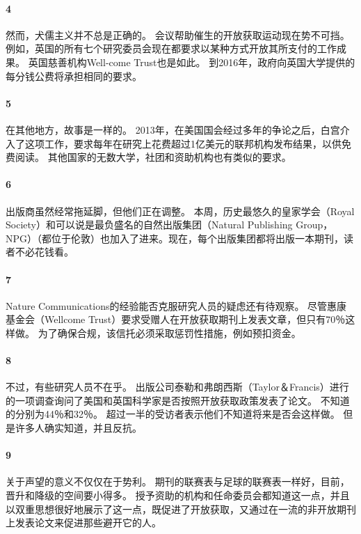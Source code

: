 \documentclass[a4paper, 12pt, UTF8]{article}
\begin{document}
\paragraph{4}然而，犬儒主义并不总是正确的。 会议帮助催生的开放获取运动现在势不可挡。 例如，英国的所有七个研究委员会现在都要求以某种方式开放其所支付的工作成果。 英国慈善机构Well-come Trust也是如此。 到2016年，政府向英国大学提供的每分钱公费将承担相同的要求。

\paragraph{5}在其他地方，故事是一样的。 2013年，在美国国会经过多年的争论之后，白宫介入了这项工作，要求每年在研究上花费超过1亿美元的联邦机构发布结果，以供免费阅读。 其他国家的无数大学，社团和资助机构也有类似的要求。

\paragraph{6}出版商虽然经常拖延脚，但他们正在调整。 本周，历史最悠久的皇家学会（Royal Society）和可以说是最负盛名的自然出版集团（Natural Publishing Group，NPG）（都位于伦敦）也加入了进来。现在，每个出版集团都将出版一本期刊，读者不必花钱看。

\paragraph{7}Nature Communications的经验能否克服研究人员的疑虑还有待观察。 尽管惠康基金会（Wellcome Trust）要求受赠人在开放获取期刊上发表文章，但只有70％这样做。 为了确保合规，该信托必须采取惩罚性措施，例如预扣资金。	

\paragraph{8}不过，有些研究人员不在乎。 出版公司泰勒和弗朗西斯（Taylor＆Francis）进行的一项调查询问了美国和英国科学家是否按照开放获取政策发表了论文。 不知道的分别为44％和32％。 超过一半的受访者表示他们不知道将来是否会这样做。 但是许多人确实知道，并且反抗。

\paragraph{9}关于声望的意义不仅仅在于势利。 期刊的联赛表与足球的联赛表一样好，目前，晋升和降级的空间要小得多。 授予资助的机构和任命委员会都知道这一点，并且以双重思想很好地展示了这一点，既促进了开放获取，又通过在一流的非开放期刊上发表论文来促进那些避开它的人。
\end{document}
